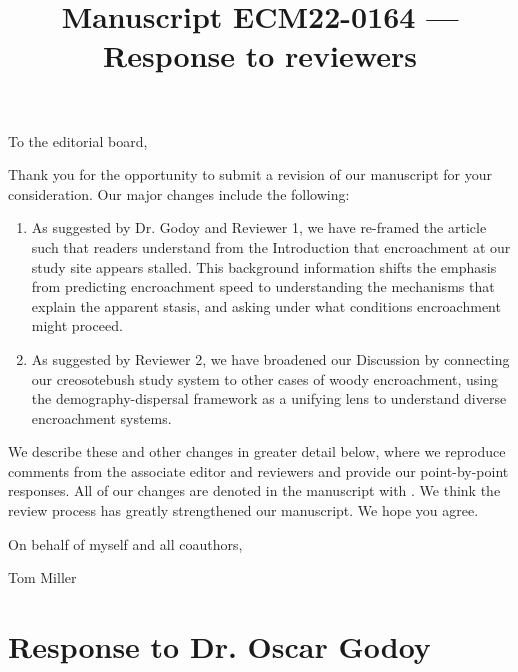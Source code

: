 \documentclass[12pt]{article}
\newcommand{\revise}[1]{{\color{Mahogany}{#1}}}
\begin{document}
\title{Manuscript ECM22-0164 --- Response to reviewers}

\maketitle
\noindent To the editorial board,

Thank you for the opportunity to submit a revision of our manuscript for your consideration. Our major changes include the following:
\begin{enumerate}
	\item As suggested by Dr. Godoy and Reviewer 1, we have re-framed the article such that readers understand from the Introduction that encroachment at our study site appears stalled. This background information shifts the emphasis from predicting encroachment speed to understanding the mechanisms that explain the apparent stasis, and asking under what conditions encroachment might proceed.
	\item As suggested by Reviewer 2, we have broadened our Discussion by connecting our creosotebush study system to other cases of woody encroachment, using the demography-dispersal framework as a unifying lens to understand diverse encroachment systems.
\end{enumerate}

We describe these and other changes in greater detail below, where we reproduce comments from the associate editor and reviewers and provide our point-by-point responses. 
All of our changes are denoted in the manuscript with \revise{Mahogany font}.
We think the review process has greatly strengthened our manuscript.
We hope you agree. 

\vspace{2em}
\hfill On behalf of myself and all coauthors,

\hfill Tom Miller

\newpage

\section{Response to Dr. Oscar Godoy}
\vspace{-2em}
\end{document}
